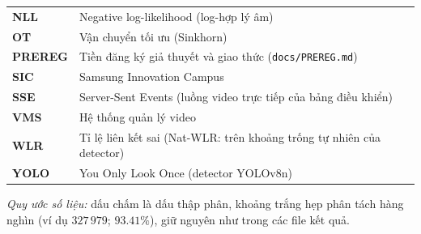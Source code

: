 \documentclass{sicaireport}
\begin{document}
\begin{table}[htbp]
\begin{tabularx}{\textwidth}{p{3.5cm} X}
        \textbf{NLL} & Negative log-likelihood (log-hợp lý âm) \\
        \textbf{OT} & Vận chuyển tối ưu (Sinkhorn) \\
        \textbf{PREREG} & Tiền đăng ký giả thuyết và giao thức (\texttt{docs/PREREG.md}) \\
        \textbf{SIC} & Samsung Innovation Campus \\
        \textbf{SSE} & Server-Sent Events (luồng video trực tiếp của bảng điều khiển) \\
        \textbf{VMS} & Hệ thống quản lý video \\
        \textbf{WLR} & Tỉ lệ liên kết sai (Nat-WLR: trên khoảng trống tự nhiên của detector) \\
        \textbf{YOLO} & You Only Look Once (detector YOLOv8n) \\
        \bottomrule
    \end{tabularx}
\end{table}

\noindent\textit{Quy ước số liệu:} dấu chấm là dấu thập phân, khoảng trắng hẹp phân tách hàng nghìn (ví dụ $327\,979$; $93.41\%$), giữ nguyên như trong các file kết quả.
\clearpage

\setcounter{page}{1}








\clearpage
\printbibliography[heading=bibintoc,title={Tài liệu tham khảo}]

\clearpage

\end{document}
